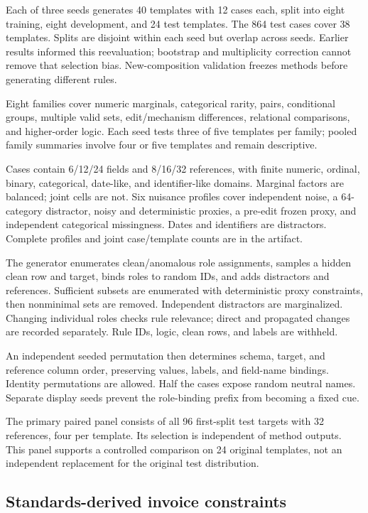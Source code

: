 \documentclass[conference]{IEEEtran}
\begin{document}
Each of three seeds generates 40 templates with 12 cases each, split into eight training, eight development, and 24 test templates. The 864 test cases cover 38 templates. Splits are disjoint within each seed but overlap across seeds. Earlier results informed this reevaluation; bootstrap and multiplicity correction cannot remove that selection bias. New-composition validation freezes methods before generating different rules.

Eight families cover numeric marginals, categorical rarity, pairs, conditional groups, multiple valid sets, edit/mechanism differences, relational comparisons, and higher-order logic. Each seed tests three of five templates per family; pooled family summaries involve four or five templates and remain descriptive.

Cases contain 6/12/24 fields and 8/16/32 references, with finite numeric, ordinal, binary, categorical, date-like, and identifier-like domains. Marginal factors are balanced; joint cells are not. Six nuisance profiles cover independent noise, a 64-category distractor, noisy and deterministic proxies, a pre-edit frozen proxy, and independent categorical missingness. Dates and identifiers are distractors. Complete profiles and joint case/template counts are in the artifact.

The generator enumerates clean/anomalous role assignments, samples a hidden clean row and target, binds roles to random IDs, and adds distractors and references. Sufficient subsets are enumerated with deterministic proxy constraints, then nonminimal sets are removed. Independent distractors are marginalized. Changing individual roles checks rule relevance; direct and propagated changes are recorded separately. Rule IDs, logic, clean rows, and labels are withheld.

An independent seeded permutation then determines schema, target, and reference column order, preserving values, labels, and field-name bindings. Identity permutations are allowed. Half the cases expose random neutral names. Separate display seeds prevent the role-binding prefix from becoming a fixed cue.




The primary paired panel consists of all 96 first-split test targets with 32 references, four per template. Its selection is independent of method outputs. This panel supports a controlled comparison on 24 original templates, not an independent replacement for the original test distribution.

\subsection{Standards-derived invoice constraints}
\end{document}
